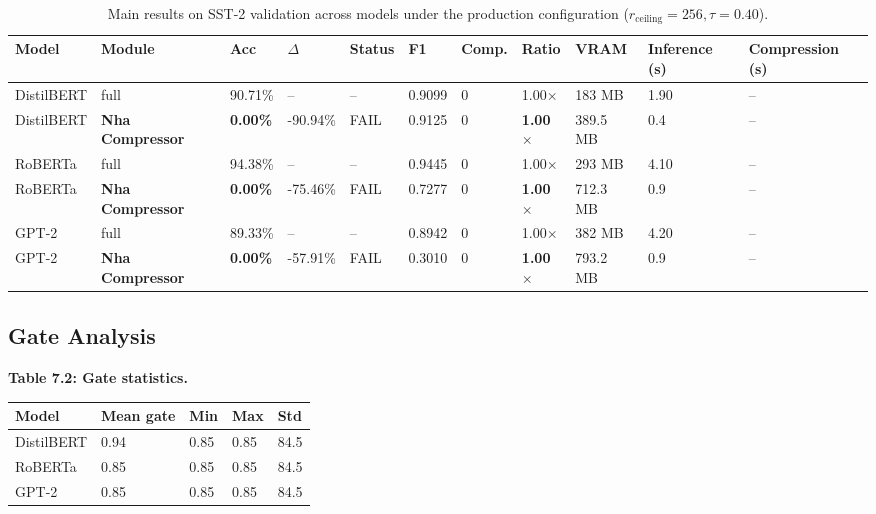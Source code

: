 \begin{table}[t]
\centering
\small
\begin{tabular}{lllllllllll}
\toprule
\textbf{Model} & \textbf{Module} & \textbf{Acc} & \textbf{$\Delta$} & \textbf{Status} & \textbf{F1} & \textbf{Comp.} & \textbf{Ratio} & \textbf{VRAM} & \textbf{Inference (s)} & \textbf{Compression (s)} \\
\midrule
DistilBERT & full & 90.71\% & -- & -- & 0.9099 & 0 & 1.00$\times$ & 183 MB & 1.90 & -- \\
DistilBERT & \textbf{Nha Compressor} & \textbf{0.00\%} & -90.94\% & FAIL & 0.9125 & 0 & \textbf{1.00$\times$} & 389.5 MB & 0.4 & -- \\
RoBERTa & full & 94.38\% & -- & -- & 0.9445 & 0 & 1.00$\times$ & 293 MB & 4.10 & -- \\
RoBERTa & \textbf{Nha Compressor} & \textbf{0.00\%} & -75.46\% & FAIL & 0.7277 & 0 & \textbf{1.00$\times$} & 712.3 MB & 0.9 & -- \\
GPT-2 & full & 89.33\% & -- & -- & 0.8942 & 0 & 1.00$\times$ & 382 MB & 4.20 & -- \\
GPT-2 & \textbf{Nha Compressor} & \textbf{0.00\%} & -57.91\% & FAIL & 0.3010 & 0 & \textbf{1.00$\times$} & 793.2 MB & 0.9 & -- \\
\bottomrule
\end{tabular}
\caption{Main results on SST-2 validation across models under the production configuration ($r_{\mathrm{ceiling}}=256, \tau=0.40$).}
\label{tab:main_sst2}
\end{table}

\subsection{Gate Analysis}

\textbf{Table 7.2: Gate statistics.}

\begin{table}[H]
\centering
\small
\begin{tabular}{lllll}
\toprule
\textbf{Model} & \textbf{Mean gate} & \textbf{Min} & \textbf{Max} & \textbf{Std} \\
\midrule
DistilBERT & 0.94 & 0.85 & 0.85 & 84.5 \\
RoBERTa & 0.85 & 0.85 & 0.85 & 84.5 \\
GPT-2 & 0.85 & 0.85 & 0.85 & 84.5 \\
\bottomrule
\end{tabular}
\end{table}

